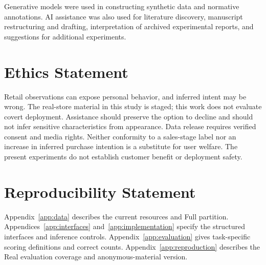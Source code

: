 \documentclass{article}
\begin{document}
Generative models were used in constructing synthetic data and normative
annotations. AI assistance was also used for literature discovery,
manuscript restructuring and drafting, interpretation of archived
experimental reports, and suggestions for additional experiments. 

\section{Ethics Statement}\label{ethics-statement}

Retail observations can expose personal behavior, and inferred intent
may be wrong. The real-store material in this study is staged; this work
does not evaluate covert deployment. Assistance should preserve the
option to decline and should not infer sensitive characteristics from
appearance. Data release requires verified consent and media rights.
Neither conformity to a sales-stage label nor an increase in inferred
purchase intention is a substitute for user welfare. The present
experiments do not establish customer benefit or deployment safety.

\section{Reproducibility Statement}\label{reproducibility-statement}

Appendix~\ref{app:data} describes the current resources and Full partition.
Appendices~\ref{app:interfaces} and~\ref{app:implementation} specify the
structured interfaces and inference controls.
Appendix~\ref{app:evaluation} gives task-specific scoring definitions and
correct counts. Appendix~\ref{app:reproduction} describes the Real
evaluation coverage and anonymous-material version.



\clearpage
\appendix

\end{document}
